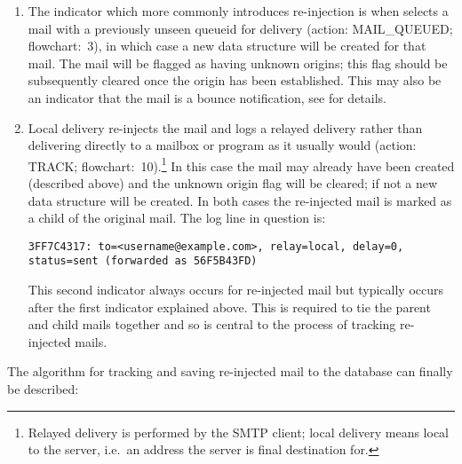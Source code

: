 \begin{enumerate}

    \item The indicator which more commonly introduces re-injection is when
         selects a mail with a previously unseen queueid for
        delivery (action: MAIL\_QUEUED\@; flowchart:~3), in which case a
        new data structure will be created for that mail.  The mail will be
        flagged as having unknown origins; this flag should be subsequently
        cleared once the origin has been established.  This may also be an
        indicator that the mail is a bounce notification, see
         for details.

    \item Local delivery re-injects the mail and logs a relayed delivery
        rather than delivering directly to a mailbox or program as it
        usually would (action: TRACK\@; flowchart:~10).\footnote{Relayed
        delivery is performed by the \gls{SMTP} client; local delivery
        means local to the server, i.e.\ an address the server is final
        destination for.} In this case the mail may already have been
        created (described above) and the unknown origin flag will be
        cleared; if not a new data structure will be created.  In both
        cases the re-injected mail is marked as a child of the original
        mail.  The log line in question is:

        \texttt{3FF7C4317: to=<username@example.com>, relay=local,
        \newline{} delay=0, status=sent (forwarded as 56F5B43FD)}

        This second indicator always occurs for re-injected mail but
        typically occurs after the first indicator explained above.  This
        is required to tie the parent and child mails together and so is
        central to the process of tracking re-injected mails.

\end{enumerate}

The algorithm for tracking and saving re-injected mail to the database can
finally be described:

